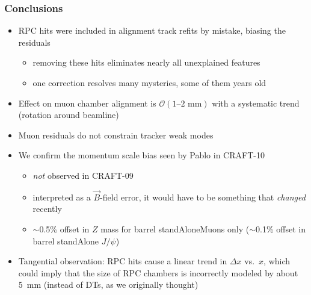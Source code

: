 \documentclass[compress]{beamer}
\begin{document}
\begin{frame}
\frametitle{Conclusions}

\begin{itemize}
\item RPC hits were included in alignment track refits by mistake, biasing the residuals
\begin{itemize}
\item removing these hits eliminates nearly all unexplained features
\item one correction resolves many mysteries, some of them years old
\end{itemize}
\item Effect on muon chamber alignment is $\mathcal{O}(\mbox{1--2 mm})$ with a systematic trend (rotation around beamline)
\item Muon residuals do not constrain tracker weak modes
\item We confirm the momentum scale bias seen by Pablo in CRAFT-10
\begin{itemize}\setlength{\itemsep}{0.1 cm}
\item {\it not} observed in CRAFT-09
\item interpreted as a $\vec{B}$-field error, it would have to be something that {\it changed} recently
\item $\sim$0.5\% offset in $Z$ mass for barrel standAloneMuons only ($\sim$0.1\% offset in barrel standAlone $J/\psi$)
\end{itemize}
\item Tangential observation: RPC hits cause a linear trend in
  $\Delta x$ vs.\ $x$, which could imply that the size of RPC chambers
  is incorrectly modeled by about 5~mm (instead of DTs, as we originally thought)
\end{itemize}

\label{numpages}
\end{frame}
\end{document}
